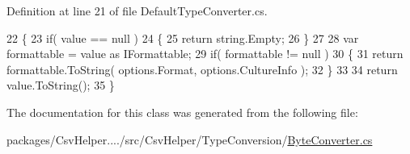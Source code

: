 Definition at line 21 of file Default\-Type\-Converter.\-cs.


\begin{DoxyCode}
22         \{
23             \textcolor{keywordflow}{if}( value == null )
24             \{
25                 \textcolor{keywordflow}{return} string.Empty;
26             \}
27 
28             var formattable = value as IFormattable;
29             \textcolor{keywordflow}{if}( formattable != null )
30             \{
31                 \textcolor{keywordflow}{return} formattable.ToString( options.Format, options.CultureInfo );
32             \}
33 
34             \textcolor{keywordflow}{return} value.ToString();
35         \}
\end{DoxyCode}


The documentation for this class was generated from the following file\-:\begin{DoxyCompactItemize}
\item 
packages/\-Csv\-Helper..../src/\-Csv\-Helper/\-Type\-Conversion/\hyperlink{a00257}{Byte\-Converter.\-cs}\end{DoxyCompactItemize}
